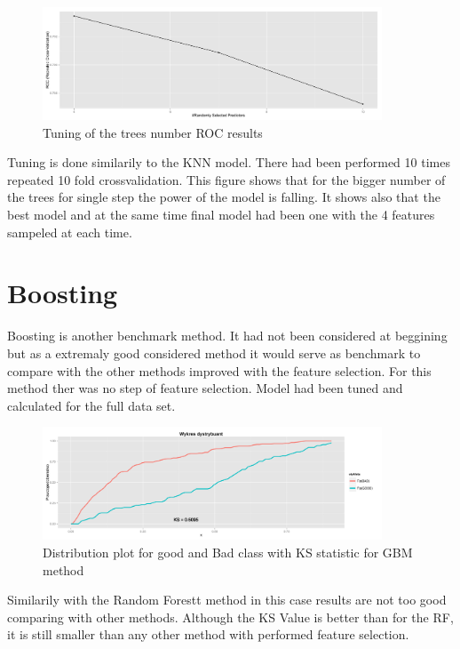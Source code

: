\documentclass[10pt]{article}\usepackage[]{graphicx}\usepackage[]{color}
\begin{document}
\begin{figure}[h!]
  \centering
  \includegraphics[width=0.9\textwidth]{Plots/TUNE_RF}
  \caption
   {Tuning of the trees number ROC results}
\end{figure}

Tuning is done similarily to the KNN model. There had been performed 10 times repeated 10 fold crossvalidation. This figure shows that for the bigger number of the trees for single step the power of the model is falling. It shows also that the best model and at the same time final model had been one with the 4 features sampeled at each time. 

\clearpage

\section{Boosting}

Boosting is another benchmark method. It had not been considered at beggining but as a extremaly good considered method it would serve as benchmark to compare with the other methods improved with the feature selection. For this method ther was no step of feature selection. Model had been tuned and calculated for the full data set. 

\begin{figure}[h!]
  \centering
  \includegraphics[width=0.9\textwidth]{Plots/GBM_KS}
  \caption[Close up of \textit{Hemidactylus} sp.]
   {Distribution plot for good and Bad class with KS statistic for GBM method}
\end{figure}


Similarily with the Random Forestt method in this case results are not too good comparing with other methods. Although the KS Value is better than for the RF, it is still smaller than any other method with performed feature selection. 
\end{document}
